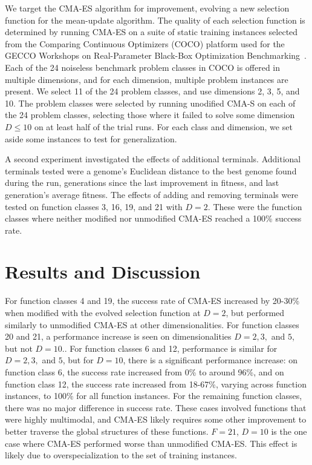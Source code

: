 \documentclass[sigconf]{acmart}
\begin{document}
We target the CMA-ES algorithm for improvement, evolving a new selection function for the mean-update algorithm. The quality of each selection function is determined by running CMA-ES on a suite of static training instances selected from the Comparing Continuous Optimizers (COCO) platform used for the GECCO Workshops on Real-Parameter Black-Box Optimization Benchmarking~\citep{cocobbob}. Each of the 24 noiseless benchmark problem classes in COCO is offered in multiple dimensions, and for each dimension, multiple problem instances are present. We select 11 of the 24 problem classes, and use dimensions 2, 3, 5, and 10. The problem classes were selected by running unodified CMA-S on each of the 24 problem classes, selecting those where it failed to solve some dimension $D \leq 10$ on at least half of the trial runs. For each class and dimension, we set aside some instances to test for generalization.

A second experiment investigated the effects of additional terminals. Additional terminals tested were a genome's Euclidean distance to the best genome found during the run, generations since the last improvement in fitness, and last generation's average fitness. The effects of adding and removing terminals were tested on function classes 3, 16, 19, and 21 with $D=2$. These were the function classes where neither modified nor unmodified CMA-ES reached a 100\% success rate. 

\section{Results and Discussion}
\label{Results}

For function classes 4 and 19, the success rate of CMA-ES increased by 20-30\% when modified with the evolved selection function at $D=2$, but performed similarly to unmodified CMA-ES at other dimensionalities. For function classes 20 and 21, a performance increase is seen on dimensionalities $D=2, 3,$ and $5$, but not $D=10$.. For function classes 6 and 12, performance is similar for $D=2, 3,$ and $5$, but for $D=10$, there is a significant performance increase: on function class 6, the success rate increased from 0\% to around 96\%, and on function class 12, the success rate increased from 18-67\%, varying across function instances, to 100\% for all function instances. For the remaining function classes, there was no major difference in success rate. These cases involved functions that were highly multimodal, and CMA-ES likely requires some other improvement to better traverse the global structures of these functions. $F=21$, $D=10$ is the one case  where CMA-ES performed worse than unmodified CMA-ES. This effect is likely due to overspecialization to the set of training instances. 
\end{document}
